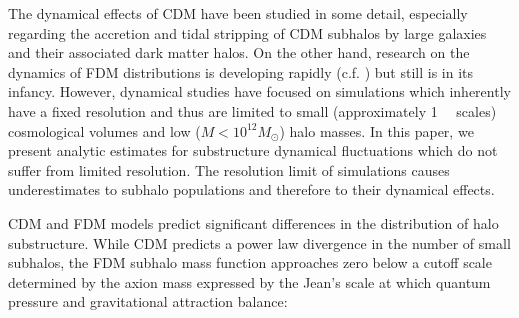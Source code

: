 \documentclass[usenatbib]{mnras}
\begin{document}
\par

The dynamical effects of CDM have been studied in some detail, especially regarding the accretion and tidal stripping of CDM subhalos by large galaxies and their associated dark matter halos. On the other hand, research on the dynamics of FDM distributions is developing rapidly (c.f. \cite{schive_solitons, Schrodinger-Poisson, Schive-virialized-wave-halos}) but still is in its infancy. However, dynamical studies have focused on simulations which inherently have a fixed resolution and thus are limited to small (approximately \SI{1}{\mega \parsec} scales) cosmological volumes and low ($M < 10^{12} M_{\odot}$) halo masses. In this paper, we present analytic estimates for substructure dynamical fluctuations which do not suffer from limited resolution. The resolution limit of simulations causes underestimates to subhalo populations and therefore to their dynamical effects. 
\par 
	CDM and FDM models predict significant differences in the distribution of halo substructure. While CDM predicts a power law divergence in the number of small subhalos, the FDM subhalo mass function approaches zero below a cutoff scale determined by the axion mass expressed by the Jean’s scale at which quantum pressure and gravitational attraction balance:
\setlength{\belowdisplayskip}{4pt} \setlength{\belowdisplayshortskip}{4pt}
\setlength{\abovedisplayskip}{4pt} \setlength{\abovedisplayshortskip}{4pt}
\end{document}
